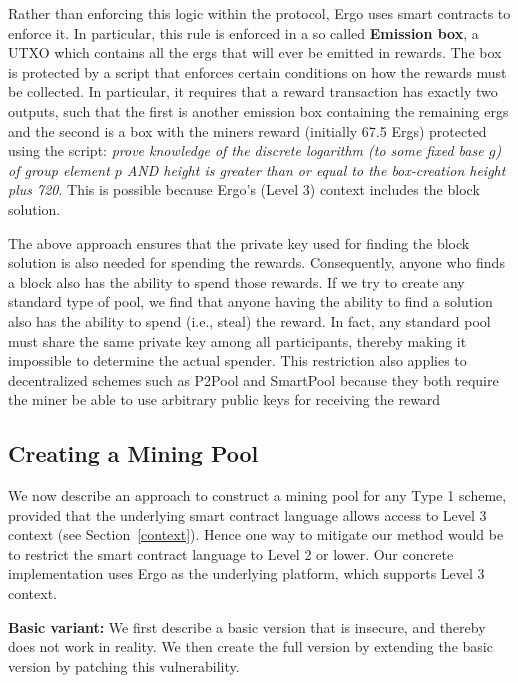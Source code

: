 \documentclass[11pt]{article}
\newcommand{\authnote}[2]{\marginpar{\parbox{\marginparwidth}{\tiny %
  \textsf{#1 {\textcolor{blue}{notes: #2}}}}}%
  \textcolor{blue}{\textbf{\dag}}}
\newcommand{\authnote}[2]{
  \textsf{#1 \textcolor{blue}{: #2}}}
\newcommand{\authnote}[2]{}
\newcommand{\snote}[1]{{\authnote{\textcolor{yellow}{Scalahub notes}}{#1}}}
\begin{document}
\snote{Maybe make this section less Ergo-specific}

Rather than enforcing this logic within the protocol, Ergo uses smart contracts to enforce it. In particular, this rule is enforced in a so called \textbf{Emission box}, a UTXO which contains all the ergs that will ever be emitted in rewards. The box is protected by a script that enforces certain conditions on how the rewards must be collected. In particular, it requires that a reward transaction has exactly two outputs, such that the first is another emission box containing the remaining ergs and the second is a box with the miners reward (initially 67.5 Ergs) protected using the script: {\em prove knowledge of the discrete logarithm (to some fixed base $g$) of group element $p$ AND height is greater than or equal to the box-creation height plus 720}.
This is possible because Ergo's (Level 3) context includes the block solution.  

The above approach ensures that the private key used for finding the block solution is also needed for spending the rewards. Consequently, anyone who finds a block also has the ability to spend those rewards. 
If we try to create any standard type of pool, we find that anyone having the ability to find a solution also has the ability to spend (i.e., steal) the reward. In fact, any standard pool must share the same private key among all participants, thereby making it impossible to determine the actual spender. This restriction also applies to decentralized schemes such as P2Pool and SmartPool because they both require the miner be able to use arbitrary public keys for receiving the reward

\subsection{Creating a Mining Pool}

We now describe an approach to construct a mining pool for any Type 1 scheme, provided that the underlying smart contract language allows access to Level 3 context (see Section~\ref{context}). Hence one way to mitigate our method would be to restrict the smart contract language to Level 2 or lower. Our concrete implementation uses Ergo as the underlying platform, which supports Level 3 context.

\textbf{Basic variant:} We first describe a basic version that is insecure, and thereby does not work in reality. We then create the full version by extending the basic version by patching this vulnerability.
\end{document}
